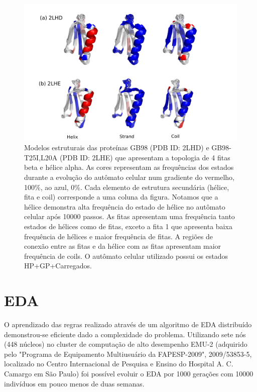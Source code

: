 \begin{figure}
  \centering
  \includegraphics[width=1\textwidth]{figures/camel_2lhd_2lhe.pdf}
  \caption{Modelos estruturais das proteínas GB98 (PDB ID: 2LHD) e GB98-T25I,L20A (PDB ID: 2LHE) que apresentam a topologia de 4 fitas beta e hélice alpha. As cores representam as frequências dos estados durante a evolução do autômato celular num gradiente do vermelho, 100\%, ao azul, 0\%. Cada elemento de estrutura secundária (hélice, fita e coil) corresponde a uma coluna da figura. Notamos que a hélice demonstra alta frequência do estado de hélice no autômato celular após 10000 passos. As fitas apresentam uma frequência tanto estados de hélices como de fitas, exceto a fita 1 que apresenta baixa frequência de hélices e maior frequência de fitas. A regiões de conexão entre as fitas e da hélice com as fitas apresentam maior frequência de coils. O autômato celular utilizado possui os estados HP+GP+Carregados.}
        \label{fig:camel_2lhd_2lhe}
\end{figure}


\section{EDA}

O aprendizado das regras realizado através de um algoritmo de EDA distribuído demonstrou-se eficiente dado a complexidade do problema. Utilizando sete nós (448 núcleos) no cluster de computação de alto desempenho EMU-2 (adquirido pelo "Programa de Equipamento  Multiusuário da FAPESP-2009", 2009/53853-5, localizado no Centro Internacional de Pesquisa e Ensino do Hospital A. C. Camargo em  São Paulo) foi possível evoluir o EDA por 1000 gerações com 10000 indivíduos em pouco menos de duas semanas.

